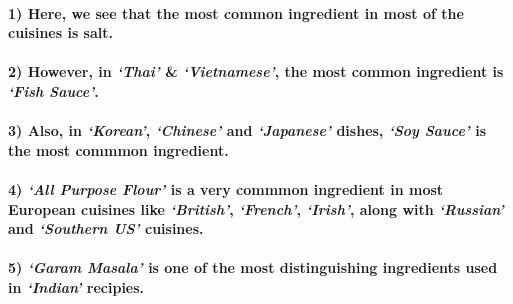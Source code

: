 \documentclass{article}
\begin{document}
    \paragraph{1) Here, we see that the most common ingredient in most of
the cuisines is
salt.}\label{here-we-see-that-the-most-common-ingredient-in-most-of-the-cuisines-is-salt.}

\paragraph{\texorpdfstring{2) However, in \emph{`Thai'} \&
\emph{`Vietnamese'}, the most common ingredient is \emph{`Fish
Sauce'}.}{2) However, in Thai \& Vietnamese, the most common ingredient is Fish Sauce.}}\label{however-in-thai-vietnamese-the-most-common-ingredient-is-fish-sauce.}

\paragraph{\texorpdfstring{3) Also, in \emph{`Korean'}, \emph{`Chinese'}
and \emph{`Japanese'} dishes, \emph{`Soy Sauce'} is the most commmon
ingredient.}{3) Also, in Korean, Chinese and Japanese dishes, Soy Sauce is the most commmon ingredient.}}\label{also-in-korean-chinese-and-japanese-dishes-soy-sauce-is-the-most-commmon-ingredient.}

\paragraph{\texorpdfstring{4) \emph{`All Purpose Flour'} is a very
commmon ingredient in most European cuisines like \emph{`British'},
\emph{`French'}, \emph{`Irish'}, along with \emph{`Russian'} and
\emph{`Southern US'}
cuisines.}{4) All Purpose Flour is a very commmon ingredient in most European cuisines like British, French, Irish, along with Russian and Southern US cuisines.}}\label{all-purpose-flour-is-a-very-commmon-ingredient-in-most-european-cuisines-like-british-french-irish-along-with-russian-and-southern-us-cuisines.}

\paragraph{\texorpdfstring{5) \emph{`Garam Masala'} is one of the most
distinguishing ingredients used in \emph{`Indian'}
recipies.}{5) Garam Masala is one of the most distinguishing ingredients used in Indian recipies.}}\label{garam-masala-is-one-of-the-most-distinguishing-ingredients-used-in-indian-recipies.}
\end{document}
